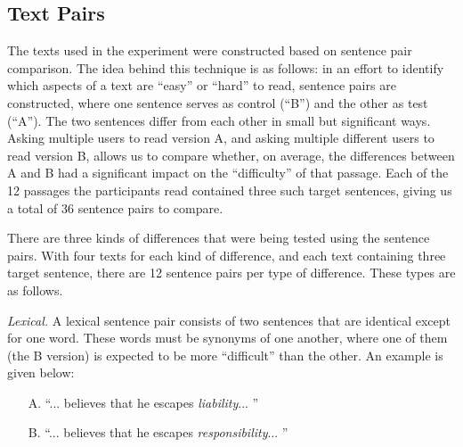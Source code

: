 \documentclass[11pt,letterpaper]{article}
\begin{document}
%	
%	
	
	\subsection{Text Pairs}
	
	The texts used in the experiment were constructed based on sentence pair comparison. The idea behind this technique is as follows: in an effort to identify which aspects of a text are ``easy'' or ``hard'' to read, sentence pairs are constructed, where one sentence serves as control (``B'') and the other as test (``A''). The two sentences differ from each other in small but significant ways. Asking multiple users to read version A, and asking multiple different users to read version B, allows us to compare whether, on average, the differences between A and B had a significant impact on the ``difficulty'' of that passage. Each of the 12 passages the participants read contained three such target sentences, giving us a total of 36 sentence pairs to compare.
	
	There are three kinds of differences that were being tested using the sentence pairs. With four texts for each kind of difference, and each text containing three target sentence, there are 12 sentence pairs per type of difference. These types are as follows.
	
	\textit{Lexical.} A lexical sentence pair consists of two sentences that are identical except for one word. These words must be synonyms of one another, where one of them (the B version) is expected to be more ``difficult'' than the other. An example is given below:
	\begin{itemize}[noitemsep, nolistsep]
		\item[A.] ``... believes that he escapes \textit{liability}... ''
		\item[B.] ``... believes that he escapes \textit{responsibility}... ''
	\end{itemize}
	
\end{document}

